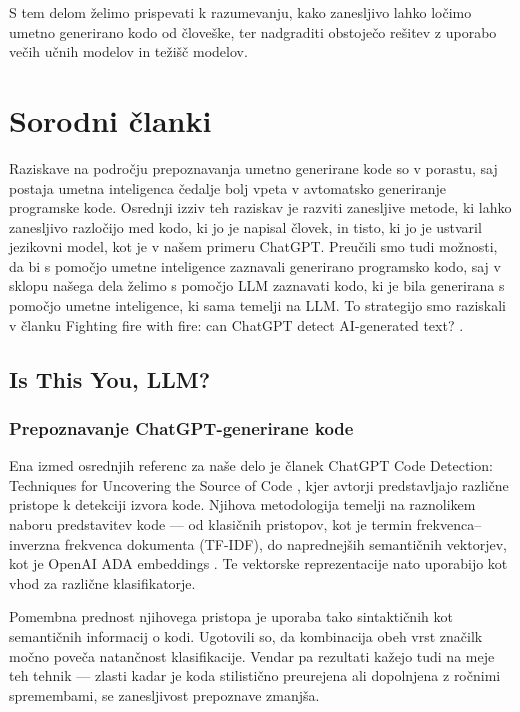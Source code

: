\documentclass[sigconf,nonacm]{acmart}
\begin{document}
S tem delom želimo prispevati k razumevanju, kako zanesljivo lahko ločimo umetno generirano kodo od človeške, ter nadgraditi obstoječo rešitev z uporabo večih učnih modelov in težišč modelov.

\section{Sorodni članki}
Raziskave na področju prepoznavanja umetno generirane kode so v porastu, saj postaja umetna inteligenca čedalje bolj vpeta v avtomatsko generiranje programske kode. Osrednji izziv teh raziskav je razviti zanesljive metode, ki lahko zanesljivo razločijo med kodo, ki jo je napisal človek, in tisto, ki jo je ustvaril jezikovni model, kot je v našem primeru ChatGPT. 
Preučili smo tudi možnosti, da bi s pomočjo umetne inteligence zaznavali generirano programsko kodo, saj v sklopu našega dela želimo s pomočjo \acrshort{LLM} zaznavati kodo, ki je bila generirana s pomočjo umetne inteligence, ki sama temelji na \acrshort{LLM}. To strategijo smo raziskali v članku Fighting fire with fire: can ChatGPT detect AI-generated text? \cite{bhattacharjee2024fighting}.

\subsection{Is This You, LLM?}
\subsubsection{Prepoznavanje ChatGPT-generirane kode}
Ena izmed osrednjih referenc za naše delo je članek ChatGPT Code Detection: Techniques for Uncovering the Source of Code \cite{oedingen2024chatgpt}, kjer avtorji predstavljajo različne pristope k detekciji izvora kode. Njihova metodologija temelji na raznolikem naboru predstavitev kode — od klasičnih pristopov, kot je termin frekvenca–inverzna frekvenca dokumenta (\acrshort{TF-IDF}), do naprednejših semantičnih vektorjev, kot je OpenAI ADA embeddings \cite{goel2024using}. Te vektorske reprezentacije nato uporabijo kot vhod za različne klasifikatorje.

Pomembna prednost njihovega pristopa je uporaba tako sintaktičnih kot semantičnih informacij o kodi. Ugotovili so, da kombinacija obeh vrst značilk močno poveča natančnost klasifikacije. Vendar pa rezultati kažejo tudi na meje teh tehnik — zlasti kadar je koda stilistično preurejena ali dopolnjena z ročnimi spremembami, se zanesljivost prepoznave zmanjša.
\end{document}
